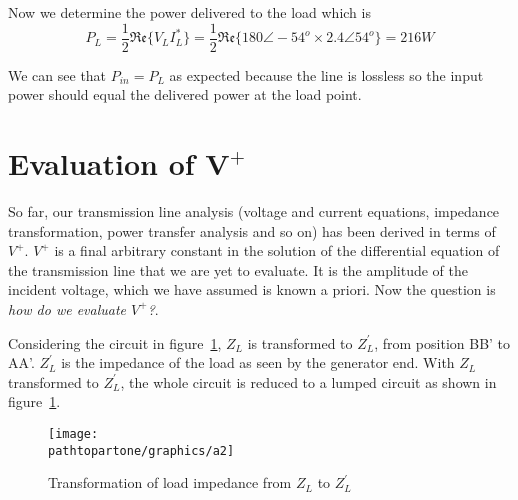 \begin{exmp}
Now we determine the power delivered to the load which is
\begin{dmath*}
P_L = \frac{1}{2}\mathfrak{Re}\lbrace V_L I_L^\ast\rbrace
= \frac{1}{2}\mathfrak{Re}\lbrace 180\angle-54^o\times 2.4\angle54^o\rbrace
= 216W
\end{dmath*}

We can see that $P_{in} = P_L$ as expected because the line is lossless so the input power should equal the delivered power at the load point.
\end{exmp}

\section{Evaluation of $\mathbf{V^{+}}$}\label{sec:evalvplus}
So far, our transmission line analysis (voltage and current equations, impedance transformation, power transfer analysis and so on) has been derived in terms of $V^+$. $V^+$ is a final arbitrary constant in the solution of the differential equation of the transmission line that we are yet to evaluate. It is the amplitude of the incident voltage, which we have assumed is known a priori. Now the question is \emph{how do we evaluate $V^{+}$?}.

Considering the circuit in figure~\ref{fig:qwerrtt}, $Z_L$ is transformed to $Z^{'}_L$, from position BB' to AA'. $Z^{'}_L$ is the impedance of the load as seen by the generator end. With $Z_L$ transformed to $Z^{'}_L$, the whole circuit is reduced to a lumped circuit as shown in figure~\ref{fig:qwerrtt}.
\begin{figure}[h]
\centering
\texttt{[image: \\pathtopartone/graphics/a2]}
\caption{Transformation of load impedance from $Z_L$ to $Z_{L}^'$}
\label{fig:qwerrtt}
\end{figure}


